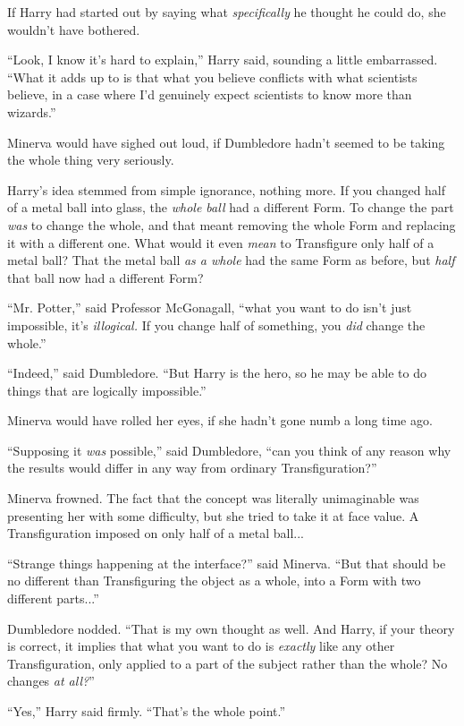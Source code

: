 If Harry had started out by saying what \emph{specifically} he thought he could do, she wouldn't have bothered.

``Look, I know it's hard to explain,'' Harry said, sounding a little embarrassed. ``What it adds up to is that what you believe conflicts with what scientists believe, in a case where I'd genuinely expect scientists to know more than wizards.''

Minerva would have sighed out loud, if Dumbledore hadn't seemed to be taking the whole thing very seriously.

Harry's idea stemmed from simple ignorance, nothing more. If you changed half of a metal ball into glass, the \emph{whole ball} had a different Form. To change the part \emph{was} to change the whole, and that meant removing the whole Form and replacing it with a different one. What would it even \emph{mean} to Transfigure only half of a metal ball? That the metal ball \emph{as a whole} had the same Form as before, but \emph{half} that ball now had a different Form?

``Mr. Potter,'' said Professor McGonagall, ``what you want to do isn't just impossible, it's \emph{illogical.} If you change half of something, you \emph{did} change the whole.''

``Indeed,'' said Dumbledore. ``But Harry is the hero, so he may be able to do things that are logically impossible.''

Minerva would have rolled her eyes, if she hadn't gone numb a long time ago.

``Supposing it \emph{was} possible,'' said Dumbledore, ``can you think of any reason why the results would differ in any way from ordinary Transfiguration?''

Minerva frowned. The fact that the concept was literally unimaginable was presenting her with some difficulty, but she tried to take it at face value. A Transfiguration imposed on only half of a metal ball...

``Strange things happening at the interface?'' said Minerva. ``But that should be no different than Transfiguring the object as a whole, into a Form with two different parts...''

Dumbledore nodded. ``That is my own thought as well. And Harry, if your theory is correct, it implies that what you want to do is \emph{exactly} like any other Transfiguration, only applied to a part of the subject rather than the whole? No changes \emph{at all?}''

``Yes,'' Harry said firmly. ``That's the whole point.''

